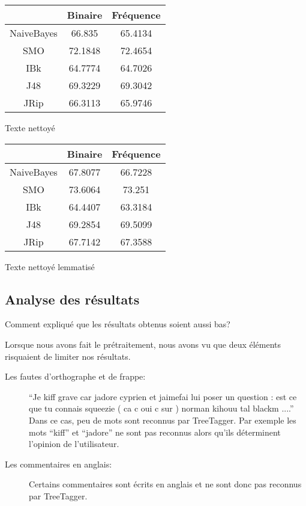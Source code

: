 \documentclass[a4paper,11pt]{report}
\begin{document}
\vspace{1cm}

\begin{minipage}{0.5\textwidth}
\begin{tabular}{|c|c|c|}
\hline
 & Binaire & Fréquence \\
 \hline
 NaiveBayes & 66.835 & 65.4134 \\
 \hline
 SMO & 72.1848 & 72.4654 \\
 \hline
 IBk & 64.7774 & 64.7026 \\
 \hline
 J48 & 69.3229 & 69.3042 \\
 \hline
 JRip & 66.3113 & 65.9746 \\
 \hline
\end{tabular}
\caption{Texte nettoyé}
\end{minipage}
\begin{minipage}{0.5\textwidth}
\begin{tabular}{|c|c|c|}
\hline
 & Binaire & Fréquence \\
 \hline
 NaiveBayes & 67.8077 & 66.7228 \\
 \hline
 SMO & 73.6064 & 73.251 \\
 \hline
 IBk & 64.4407 & 63.3184 \\
 \hline
 J48 & 69.2854 & 69.5099 \\
 \hline
 JRip & 67.7142 & 67.3588 \\
 \hline
\end{tabular}
\caption{Texte nettoyé lemmatisé}
\end{minipage}


\subsection{Analyse des résultats}
Comment expliqué que les résultats obtenus soient aussi bas?

Lorsque nous avons fait le prétraitement, nous avons vu que deux éléments risquaient de limiter nos résultats.

\begin{description}
	\item [Les fautes d'orthographe et de frappe: ]``Je kiff grave car jadore cyprien et jaimefai lui poser un question : est ce que tu connais squeezie ( ca c oui c sur ) norman kihouu tal blackm ....''\\
	
	Dans ce cas, peu de mots sont reconnus par TreeTagger. Par exemple les mots ``kiff'' et ``jadore'' ne sont pas reconnus alors qu'ils déterminent l'opinion de l'utilisateur.
	
	\item [Les commentaires en anglais: ]Certains commentaires sont écrits en anglais et ne sont donc pas reconnus par TreeTagger.
\end{description}
\end{document}
